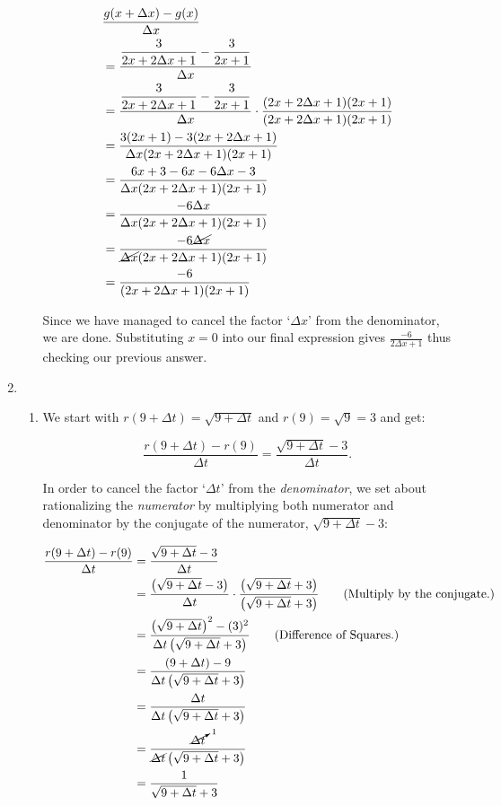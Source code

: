 \begin{ex}
\begin{enumerate}
\begin{enumerate}
\begin{align*}
& \dfrac{g(x+\Delta x)-g(x)}{\Delta x} \\
& = \dfrac{\dfrac{3}{2x+2\Delta x+1}-\dfrac{3}{2x+1}}{\Delta x} \\
& = \dfrac{\dfrac{3}{2x+2\Delta x+1}-\dfrac{3}{2x+1}}{\Delta x} \cdot \dfrac{(2x+2\Delta x+1)(2x+1)}{(2x+2\Delta x+1)(2x+1)} \\
& = \dfrac{3(2x+1)-3(2x+2\Delta x+1)}{\Delta x(2x+2\Delta x+1)(2x+1)}  \\
& = \dfrac{6x+3-6x-6\Delta x-3}{\Delta x(2x+2\Delta x+1)(2x+1)}  \\
& = \dfrac{-6\Delta x}{\Delta x(2x+2\Delta x+1)(2x+1)}  \\
& = \dfrac{-6\cancel{\Delta x}}{\cancel{\Delta x}(2x+2\Delta x+1)(2x+1)}  \\
& = \dfrac{-6}{(2x+2\Delta x+1)(2x+1)} \\ 
\end{align*}

Since we have managed to cancel the factor `$\Delta x$' from the denominator, we are done.  Substituting $x=0$ into our final expression gives $\frac{-6}{2 \Delta x +1}$ thus checking our previous answer.

\end{enumerate}

\item 

\begin{enumerate}


\item We start with $r(9+\Delta t) = \sqrt{9+\Delta t}$ and $r(9) = \sqrt{9} = 3$ and get:

\[ \dfrac{r(9+\Delta t)-r(9)}{\Delta t} = \dfrac{\sqrt{9+\Delta t} - 3}{\Delta t}.\]


In order to cancel the factor `$\Delta t$' from the \textit{denominator}, we set about rationalizing the \textit{numerator} by multiplying both numerator and denominator by the conjugate of the numerator, $\sqrt{9+\Delta t} - 3$:

\begin{align*}
\dfrac{r(9+\Delta t) - r(9)}{\Delta t} & = \dfrac{\sqrt{9+\Delta t} - 3}{\Delta t} \\
& = \dfrac{\left(\sqrt{9+\Delta t} - 3 \right)}{\Delta t} \cdot \dfrac{\left(\sqrt{9+\Delta t} + 3\right)}{\left(\sqrt{9+\Delta t} + 3\right)} \tag{Multiply by the conjugate.} \\
& = \dfrac{\left(\sqrt{9+\Delta t}\right)^2 -(3)^2}{\Delta t\left(\sqrt{9+\Delta t} + 3\right)} \tag{Difference of Squares.}\\
& = \dfrac{(9+\Delta t) - 9}{\Delta t\left(\sqrt{9+\Delta t} + 3\right)} \\
& = \dfrac{\Delta t}{\Delta t\left(\sqrt{9+\Delta t} + 3\right)} \\
& = \dfrac{\cancelto{1}{\Delta t}}{\cancel{\Delta t}\left(\sqrt{9+\Delta t} + 3\right)} \\
& = \dfrac{1}{\sqrt{9+\Delta t} +3} \\ 
\end{align*}


\end{enumerate}
\end{enumerate}
\end{ex}
